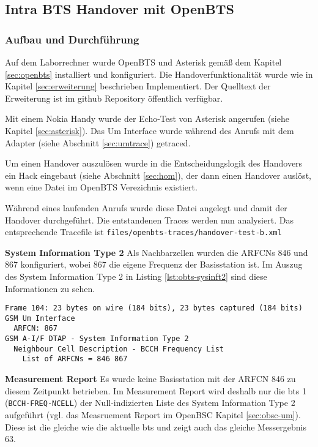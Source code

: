 \subsection{Intra BTS Handover mit OpenBTS}
\subsubsection{Aufbau und Durchführung}
Auf dem Laborrechner wurde OpenBTS und Asterisk gemäß dem Kapitel \ref{sec:openbts} installiert und konfiguriert. Die Handoverfunktionalität wurde wie in Kapitel \ref{sec:erweiterung} beschrieben Implementiert. Der Quelltext der Erweiterung ist im github Repository \cite{bib:openbtshandover} öffentlich verfügbar. 

Mit einem Nokia Handy wurde der Echo-Test von Asterisk angerufen (siehe Kapitel \ref{sec:asterisk}). Das Um Interface wurde während des Anrufs mit dem Adapter (siehe Abschnitt \ref{sec:umtrace}) getraced. 

Um einen Handover auszulösen wurde in die Entscheidungslogik des Handovers ein Hack eingebaut (siehe Abschnitt \ref{sec:hom}), der dann einen Handover auslöst, wenn eine Datei im OpenBTS Verezichnis existiert.

Während eines laufenden Anrufs wurde diese Datei angelegt und damit der Handover durchgeführt. Die entstandenen Traces werden nun analysiert. Das entsprechende Tracefile ist \lstinline{files/openbts-traces/handover-test-b.xml}

\textbf{System Information Type 2} Als Nachbarzellen wurden die \glspl{ARFCN} 846 und 867 konfiguriert, wobei 867 die eigene Frequenz der Basisstation ist. Im Auszug des System Information Type 2 in Listing \ref{lst:obts-sysinft2} sind diese Informationen zu sehen.

\begin{lstlisting}[label=lst:obts-sysinft2, caption={Auszug aus dem System Information Type 2 von OpenBTS}]
Frame 104: 23 bytes on wire (184 bits), 23 bytes captured (184 bits)
GSM Um Interface
  ARFCN: 867
GSM A-I/F DTAP - System Information Type 2
  Neighbour Cell Description - BCCH Frequency List
    List of ARFCNs = 846 867
\end{lstlisting}

\textbf{Measurement Report} Es wurde keine Basisstation mit der \gls{ARFCN} 846 zu diesem Zeitpunkt betrieben. Im Measurement Report wird deshalb nur die \gls{bts} 1 (\lstinline{BCCH-FREQ-NCELL}) der Null-indizierten Liste des System Information Type 2 aufgeführt (vgl. das Measruement Report im OpenBSC Kapitel \ref{sec:obsc-um}). Diese ist die gleiche wie die aktuelle \gls{bts} und zeigt auch das gleiche Messergebnis 63.

